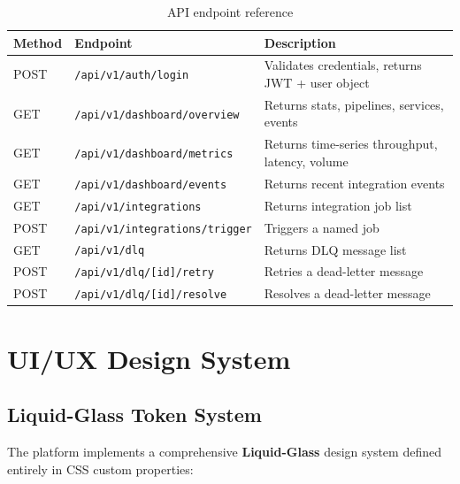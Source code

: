 \documentclass[12pt,a4paper]{article}
\begin{document}
\begin{table}[H]
\centering
\begin{tabularx}{\textwidth}{llX}
\toprule
\textbf{Method} & \textbf{Endpoint} & \textbf{Description} \\
\midrule
POST & \texttt{/api/v1/auth/login}          & Validates credentials, returns JWT + user object \\
GET  & \texttt{/api/v1/dashboard/overview}   & Returns stats, pipelines, services, events \\
GET  & \texttt{/api/v1/dashboard/metrics}    & Returns time-series throughput, latency, volume \\
GET  & \texttt{/api/v1/dashboard/events}     & Returns recent integration events \\
GET  & \texttt{/api/v1/integrations}         & Returns integration job list \\
POST & \texttt{/api/v1/integrations/trigger}  & Triggers a named job \\
GET  & \texttt{/api/v1/dlq}                  & Returns DLQ message list \\
POST & \texttt{/api/v1/dlq/[id]/retry}       & Retries a dead-letter message \\
POST & \texttt{/api/v1/dlq/[id]/resolve}     & Resolves a dead-letter message \\
\bottomrule
\end{tabularx}
\caption{API endpoint reference}
\end{table}

\section{UI/UX Design System}

\subsection{Liquid-Glass Token System}

The platform implements a comprehensive \textbf{Liquid-Glass} design system defined entirely in CSS custom properties:
\end{document}
